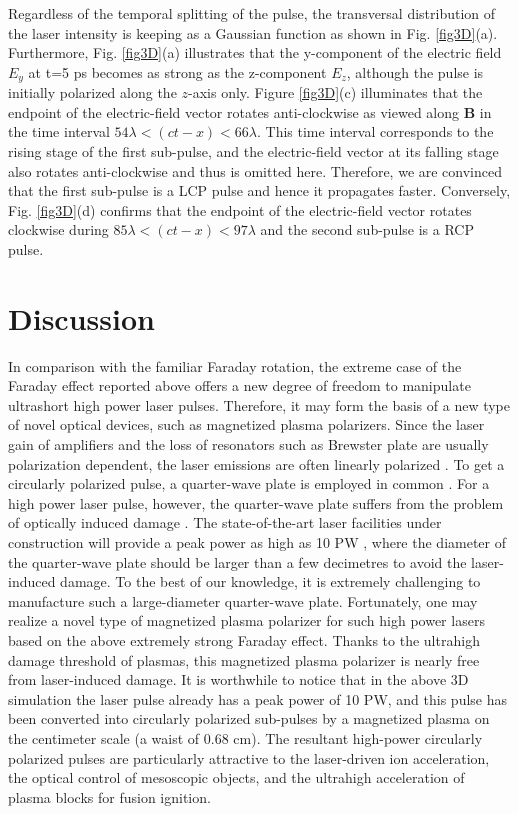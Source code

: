\documentclass[%
aps,
preprint,
showpacs,
preprintnumbers,
 amsmath,
 amssymb,
 prl,
]{revtex4-1}
\begin{document}
Regardless of the temporal splitting of the pulse, the transversal distribution of the laser intensity is keeping as a Gaussian function as shown in Fig. \ref{fig3D}(a).
Furthermore, Fig. \ref{fig3D}(a) illustrates that the y-component of the electric field $E_y$ at t=5 ps becomes as strong as the z-component $E_z$, although the pulse is initially polarized along the $z$-axis only. Figure \ref{fig3D}(c) illuminates that the endpoint of the electric-field vector rotates anti-clockwise as viewed along $\textbf{B}$ in the time interval $54 \lambda<(ct-x)<66 \lambda $. This time interval corresponds to the rising stage of the first sub-pulse, and the electric-field vector at its falling stage also rotates anti-clockwise and thus is omitted here. Therefore, we are convinced that the first sub-pulse is a LCP pulse and hence it propagates faster. Conversely, Fig. \ref{fig3D}(d) confirms that the endpoint of the electric-field vector rotates clockwise during $ 85 \lambda<(ct-x)<97 \lambda$ and the second sub-pulse is a RCP pulse.



\section{Discussion}

In comparison with the familiar Faraday rotation, the extreme case of the Faraday effect reported above offers a new degree of freedom to manipulate ultrashort high power laser pulses.
Therefore, it may form the basis of a new type of novel optical devices, such as magnetized plasma polarizers.
Since the laser gain of amplifiers and the loss of resonators such as Brewster plate are usually polarization dependent, the laser emissions are often linearly polarized \cite{Koechner}.
To get a circularly polarized pulse, a quarter-wave plate is employed in common \cite{Saleh}.
For a high power laser pulse, however, the quarter-wave plate suffers from the problem of optically induced damage \cite{Koechner}.
The state-of-the-art laser facilities under construction will provide a peak power as high as 10 PW \cite{Papadopoulos}, where the diameter of the quarter-wave plate should be larger than a few decimetres to avoid the laser-induced damage.
To the best of our knowledge, it is extremely challenging to manufacture such a large-diameter quarter-wave plate.
Fortunately, one may realize a novel type of magnetized plasma polarizer for such high power lasers based on the above extremely strong Faraday effect.
Thanks to the ultrahigh damage threshold of plasmas, this magnetized plasma polarizer is nearly free from laser-induced damage. It is worthwhile to notice that in the above 3D simulation the laser pulse already has a peak power of 10 PW, and this pulse has been converted into circularly polarized sub-pulses by a magnetized plasma on the centimeter scale (a waist of 0.68 cm).
The resultant high-power circularly polarized pulses are particularly attractive to the laser-driven ion acceleration\cite{Daido,Macchi}, the optical control of mesoscopic objects\cite{Arita}, and the ultrahigh acceleration of plasma blocks for fusion ignition\cite{Eliezer,HoraLPB,Miley,Weng}.
\end{document}
